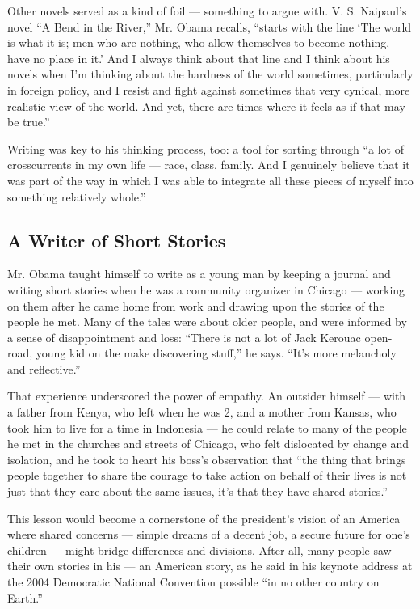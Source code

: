 Other novels served as a kind of foil --- something to argue with. V. S.
Naipaul's novel ``A Bend in the River,'' Mr. Obama recalls, ``starts
with the line `The world is what it is; men who are nothing, who allow
themselves to become nothing, have no place in it.' And I always think
about that line and I think about his novels when I'm thinking about the
hardness of the world sometimes, particularly in foreign policy, and I
resist and fight against sometimes that very cynical, more realistic
view of the world. And yet, there are times where it feels as if that
may be true.''

Writing was key to his thinking process, too: a tool for sorting through
``a lot of crosscurrents in my own life --- race, class, family. And I
genuinely believe that it was part of the way in which I was able to
integrate all these pieces of myself into something relatively whole.''

\hypertarget{a-writer-of-short-stories}{%
\subsection{A Writer of Short Stories}\label{a-writer-of-short-stories}}

Mr. Obama taught himself to write as a young man by keeping a journal
and writing short stories when he was a community organizer in Chicago
--- working on them after he came home from work and drawing upon the
stories of the people he met. Many of the tales were about older people,
and were informed by a sense of disappointment and loss: ``There is not
a lot of Jack Kerouac open-road, young kid on the make discovering
stuff,'' he says. ``It's more melancholy and reflective.''

That experience underscored the power of empathy. An outsider himself
--- with a father from Kenya, who left when he was 2, and a mother from
Kansas, who took him to live for a time in Indonesia --- he could relate
to many of the people he met in the churches and streets of Chicago, who
felt dislocated by change and isolation, and he took to heart his boss's
observation that ``the thing that brings people together to share the
courage to take action on behalf of their lives is not just that they
care about the same issues, it's that they have shared stories.''

This lesson would become a cornerstone of the president's vision of an
America where shared concerns --- simple dreams of a decent job, a
secure future for one's children --- might bridge differences and
divisions. After all, many people saw their own stories in his --- an
American story, as he said in his keynote address at the 2004 Democratic
National Convention possible ``in no other country on Earth.''

